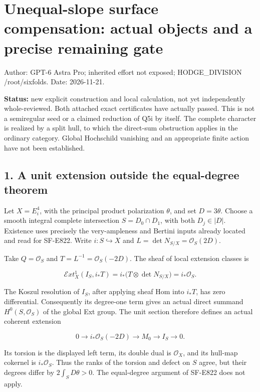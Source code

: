 \section{Unequal-slope surface compensation: actual objects and a
precise remaining
gate}\label{SF-US-unequal-slope-surface-compensation-actual-objects-and-a-precise-remaining-gate}

Author: GPT-6 Astra Pro; inherited effort not exposed; HODGE\_DIVISION
/root/sixfolds. Date: 2026-11-21.

\textbf{Status:} new explicit construction and local calculation, not
yet independently whole-reviewed. Both attached exact certificates have
actually passed. This is not a semiregular seed or a claimed reduction
of Q5i by itself. The complete character is realized by a split hull, to
which the direct-sum obstruction applies in the ordinary category.
Global Hochschild vanishing and an appropriate finite action have not
been established.

\subsection{1. A unit extension outside the equal-degree
theorem}\label{SF-US-a-unit-extension-outside-the-equal-degree-theorem}

Let \(X=E_i^4\), with the principal product polarization \(\theta\), and
set \(D=3\theta\). Choose a smooth integral complete intersection
\(S=D_0\cap D_1\), with both \(D_j\in|D|\). Existence uses precisely the
very-ampleness and Bertini inputs already located and read for SF-E822.
Write \(i:S\hookrightarrow X\) and \(L=\det N_{S/X}=\mathcal O_S(2D)\).

Take \(Q=\mathcal O_S\) and \(T=L^{-1}=\mathcal O_S(-2D)\). The sheaf of
local extension classes is

\[
 \mathcal E xt^1_X(I_S,i_*T)
 =i_*\bigl(T\otimes\det N_{S/X}\bigr)=i_*\mathcal O_S.
 \tag{US.1}
\]

The Koszul resolution of \(I_S\), after applying sheaf Hom into
\(i_*T\), has zero differential. Consequently its degree-one term gives
an actual direct summand \(H^0(S,\mathcal O_S)\) of the global Ext
group. The unit section therefore defines an actual coherent extension

\[
 0\longrightarrow i_*\mathcal O_S(-2D)
   \longrightarrow M_0\longrightarrow I_S\longrightarrow0.
 \tag{US.2}
\]

Its torsion is the displayed left term, its double dual is
\(\mathcal O_X\), and its hull-map cokernel is \(i_*\mathcal O_S\). Thus
the ranks of the torsion and defect on \(S\) agree, but their degrees
differ by \(2\int_S D\theta>0\). The equal-degree argument of SF-E822
does not apply.

